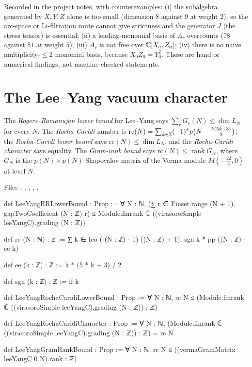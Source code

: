 \begin{warning}[title={Dead ends for strictness}]
Recorded in the project notes, with counterexamples: (i) the subalgebra generated by $X,Y,Z$ alone is too small (dimension $8$ against $9$ at weight $2$), so
the arc-space or Li-filtration route cannot give strictness and the generator $J$ (the stress tensor) is essential; (ii) a leading-monomial basis of $A_r$
overcounts ($78$ against $81$ at weight $5$); (iii) $A_r$ is not free over ${\mathbb{C}}[X_a,Z_a]$; (iv) there is no naive multiplicity-$\le2$ monomial basis, because
$X_0Z_0=Y_0^2$. These are hand or numerical findings, not machine-checked statements.
\end{warning}

\section{The Lee--Yang vacuum character}\label{l28:sec:character}

\begin{definition}\label{l28:def:rr}
The \emph{Rogers--Ramanujan lower bound} for Lee--Yang says $\sum_rG_r(N)\le\dim L_N$ for every $N$. The \emph{Rocha-Caridi} number is
$\mathrm{rc}(N)=\sum_{k\in{\mathbb{Z}}}(-1)^kp\bigl(N-\tfrac{k(5k+3)}2\bigr)$; the \emph{Rocha-Caridi lower bound} says $\mathrm{rc}(N)\le\dim L_N$, and the
\emph{Rocha-Caridi character} says equality. The \emph{Gram-rank bound} says $\mathrm{rc}(N)\le\operatorname{rank}G_N$, where $G_N$ is the $p(N)\times p(N)$
Shapovalov matrix of the Verma module $M(-\tfrac{22}5,0)$ at level $N$.
\end{definition}

\noindent Files , ,
, , .
\begin{leancode}
def LeeYangRRLowerBound : Prop :=
  ∀ N : ℕ, (∑ r ∈ Finset.range (N + 1), gapTwoCoefficient (N : ℤ) r) ≤
    Module.finrank ℂ ((virasoroSimple leeYangC).grading (N : ℤ))

def rc (N : ℕ) : ℤ := ∑ k ∈ Ico (-(N : ℤ) - 1) ((N : ℤ) + 1), sgn k * pp ((N : ℤ) - ee k)

def ee (k : ℤ) : ℤ := k * (5 * k + 3) / 2

def sgn (k : ℤ) : ℤ := if k %

def LeeYangRochaCaridiLowerBound : Prop :=
  ∀ N : ℕ, rc N ≤ (Module.finrank ℂ ((virasoroSimple leeYangC).grading (N : ℤ)) : ℤ)

def LeeYangRochaCaridiCharacter : Prop :=
  ∀ N : ℕ, (Module.finrank ℂ ((virasoroSimple leeYangC).grading (N : ℤ)) : ℤ) = rc N

def LeeYangGramRankBound : Prop :=
  ∀ N : ℕ, rc N ≤ ((vermaGramMatrix leeYangC 0 N).rank : ℤ)
\end{leancode}

